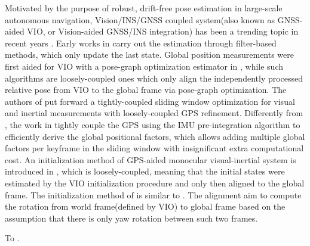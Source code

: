 \documentclass[journal,article,submit,moreauthors,pdftex]{Definitions/mdpi}
\begin{document}
Motivated by the purpose of robust, drift-free pose estimation in large-scale autonomous navigation, Vision/INS/GNSS coupled system(also known as GNSS-aided VIO, or Vision-aided GNSS/INS integration) has been a trending topic in recent years \cite{cioffiTightlycoupledFusionGlobal2020}. Early works in \cite{shunsukeGNSSINSOnboard2015,sahmoudiAnalysisNavigationSystem2016,kimTightlycoupledIntegrationGPS2016,adeelResearchPerformanceAnalysis2017,leeIntermittentGPSaidedVIO} carry out the estimation through filter-based methods, which only update the last state. Global position measurements were first aided for VIO with a pose-graph optimization estimator in \cite{mascaroGOMSFGraphOptimizationBased2018,qinGeneralOptimizationbasedFramework2019a}, while such algorithms are loosely-coupled ones which only align the independently processed relative pose from VIO to the global frame via pose-graph optimization. The authors of \cite{yuGPSaidedOmnidirectionalVisualInertial2019} put forward a tightly-coupled sliding window optimization for visual and inertial measurements with loosely-coupled GPS refinement. Differently from \cite{yuGPSaidedOmnidirectionalVisualInertial2019}, the work in \cite{cioffiTightlycoupledFusionGlobal2020} tightly couple the GPS using the IMU pre-integration algorithm to efficiently derive the global positional factors, which allows adding multiple global factors per keyframe in the sliding window with insignificant extra computational cost. An initialization method of GPS-aided monocular visual-inertial system is introduced in \cite{yuGPSaidedOmnidirectionalVisualInertial2019}, which is loosely-coupled, meaning that the initial states were estimated by the VIO initialization procedure and only then aligned to the global frame. The initialization method of \cite{leeIntermittentGPSaidedVIO} is similar to \cite{yuGPSaidedOmnidirectionalVisualInertial2019}. The alignment aim to compute the rotation from world frame(defined by VIO) to global frame based on the assumption that there is only yaw rotation between such two frames. 

To . 

\end{document}
